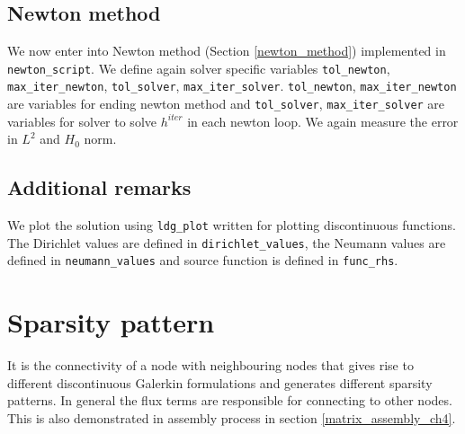 \documentclass[a4paper,openany]{book}
\begin{document}
\subsection{Newton method}

We now enter into Newton method (Section \ref{newton_method}) implemented in \verb|newton_script|. We define again solver specific variables \verb|tol_newton|, \verb|max_iter_newton|, \verb|tol_solver|, \verb|max_iter_solver|. \verb|tol_newton|, \verb|max_iter_newton| are variables for ending newton method and \verb|tol_solver|, \verb|max_iter_solver| are variables for solver to solve $h^{iter}$ in each newton loop. We again measure the error in $L^2$ and $H_0$ norm.\\

\subsection{Additional remarks}

We plot the solution using  \verb|ldg_plot| written for plotting discontinuous functions. The Dirichlet values are defined in \verb|dirichlet_values|, the Neumann values are defined in \verb|neumann_values| and source function is defined in \verb|func_rhs|. 

\section{Sparsity pattern}

It is the connectivity of a node with neighbouring nodes that gives rise to different discontinuous Galerkin formulations and generates different sparsity patterns. In general the flux terms are responsible for connecting to other nodes. This is also demonstrated in assembly process in section \ref{matrix_assembly_ch4}. \\
\end{document}
